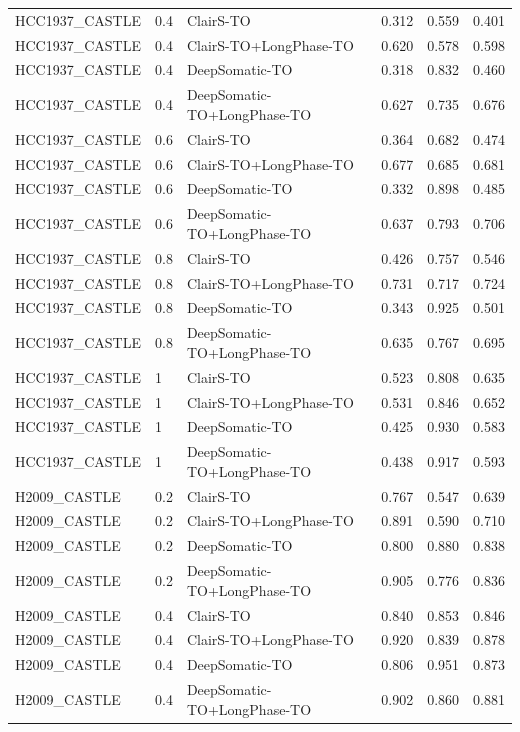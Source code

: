 \documentclass[pdflatex,sn-nature]{sn-jnl}
\begin{document}
{\begin{longtable}{@{}lllccc@{}}
  HCC1937\_CASTLE & 0.4 & ClairS-TO & 0.312 & 0.559 & 0.401 \\
  HCC1937\_CASTLE & 0.4 & ClairS-TO+LongPhase-TO & 0.620 & 0.578 & 0.598 \\
  HCC1937\_CASTLE & 0.4 & DeepSomatic-TO & 0.318 & 0.832 & 0.460 \\
  HCC1937\_CASTLE & 0.4 & DeepSomatic-TO+LongPhase-TO & 0.627 & 0.735 & 0.676 \\
  HCC1937\_CASTLE & 0.6 & ClairS-TO & 0.364 & 0.682 & 0.474 \\
  HCC1937\_CASTLE & 0.6 & ClairS-TO+LongPhase-TO & 0.677 & 0.685 & 0.681 \\
  HCC1937\_CASTLE & 0.6 & DeepSomatic-TO & 0.332 & 0.898 & 0.485 \\
  HCC1937\_CASTLE & 0.6 & DeepSomatic-TO+LongPhase-TO & 0.637 & 0.793 & 0.706 \\
  HCC1937\_CASTLE & 0.8 & ClairS-TO & 0.426 & 0.757 & 0.546 \\
  HCC1937\_CASTLE & 0.8 & ClairS-TO+LongPhase-TO & 0.731 & 0.717 & 0.724 \\
  HCC1937\_CASTLE & 0.8 & DeepSomatic-TO & 0.343 & 0.925 & 0.501 \\
  HCC1937\_CASTLE & 0.8 & DeepSomatic-TO+LongPhase-TO & 0.635 & 0.767 & 0.695 \\
  HCC1937\_CASTLE & 1 & ClairS-TO & 0.523 & 0.808 & 0.635 \\
  HCC1937\_CASTLE & 1 & ClairS-TO+LongPhase-TO & 0.531 & 0.846 & 0.652 \\
  HCC1937\_CASTLE & 1 & DeepSomatic-TO & 0.425 & 0.930 & 0.583 \\
  HCC1937\_CASTLE & 1 & DeepSomatic-TO+LongPhase-TO & 0.438 & 0.917 & 0.593 \\
  \addlinespace
  H2009\_CASTLE & 0.2 & ClairS-TO & 0.767 & 0.547 & 0.639 \\
  H2009\_CASTLE & 0.2 & ClairS-TO+LongPhase-TO & 0.891 & 0.590 & 0.710 \\
  H2009\_CASTLE & 0.2 & DeepSomatic-TO & 0.800 & 0.880 & 0.838 \\
  H2009\_CASTLE & 0.2 & DeepSomatic-TO+LongPhase-TO & 0.905 & 0.776 & 0.836 \\
  H2009\_CASTLE & 0.4 & ClairS-TO & 0.840 & 0.853 & 0.846 \\
  H2009\_CASTLE & 0.4 & ClairS-TO+LongPhase-TO & 0.920 & 0.839 & 0.878 \\
  H2009\_CASTLE & 0.4 & DeepSomatic-TO & 0.806 & 0.951 & 0.873 \\
  H2009\_CASTLE & 0.4 & DeepSomatic-TO+LongPhase-TO & 0.902 & 0.860 & 0.881 \\

\end{longtable}}
\end{document}
